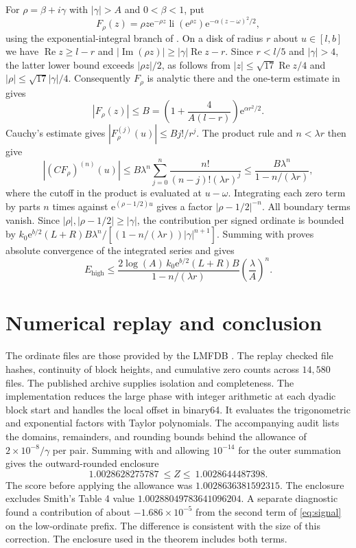 \documentclass[11pt]{article}
\newcommand{\lii}{\operatorname{li}}
\newcommand{\ee}{\mathrm{e}}
\begin{document}
For $\rho=\beta+i\gamma$ with $|\gamma|>A$ and $0<\beta<1$, put
\[
F_\rho(z)=\rho z\ee^{-\rho z}\lii(\ee^{\rho z})
          \ee^{-\alpha(z-\omega)^2/2},
\]
using the exponential-integral branch of \cite[(4.11)]{revers}.
On a disk of radius $r$ about $u\in[l,b]$ we have
$\operatorname{Re}z\ge l-r$ and
$|\operatorname{Im}(\rho z)|\ge|\gamma|\operatorname{Re}z-r$.
Since $r<l/5$ and $|\gamma|>4$, the latter lower bound exceeds
$|\rho z|/2$, as follows from $|z|\le\sqrt{17}\operatorname{Re}z/4$
and $|\rho|\le\sqrt{17}|\gamma|/4$.
Consequently $F_\rho$ is analytic there and the one-term estimate
in \cite[(4.12)]{revers} gives
\[
|F_\rho(z)|\le B=\left(1+\frac{4}{A(l-r)}\right)\ee^{\alpha r^2/2}.
\]
Cauchy's estimate gives $|F_\rho^{(j)}(u)|\le Bj!/r^j$.
The product rule and $n<\lambda r$ then give
\[
\left|(C F_\rho)^{(n)}(u)\right|
\le B\lambda^n\sum_{j=0}^n\frac{n!}{(n-j)!(\lambda r)^j}
\le \frac{B\lambda^n}{1-n/(\lambda r)},
\]
where the cutoff in the product is evaluated at $u-\omega$.
Integrating each zero term by parts $n$ times against
$\ee^{(\rho-1/2)u}$ gives a factor $|\rho-1/2|^{-n}$.
All boundary terms vanish. Since $|\rho|,|\rho-1/2|\ge|\gamma|$,
the contribution per signed ordinate is bounded by
$k_0\ee^{b/2}(L+R)B\lambda^n/[(1-n/(\lambda r))|\gamma|^{n+1}]$.
Summing with \cite[Lemma 4.7(a)]{revers} proves absolute convergence
of the integrated series and gives
\[
E_{\mathrm{high}}\le
\frac{2\log(A)\,k_0\ee^{b/2}(L+R)B}{1-n/(\lambda r)}
\left(\frac{\lambda}{A}\right)^n .
\]

\section{Numerical replay and conclusion}
The ordinate files are those provided by the LMFDB \cite{lmfdb}.
The replay checked file hashes, continuity of block heights, and
cumulative zero counts across $14{,}580$ files. The published
archive supplies isolation and completeness. The implementation
reduces the large phase with integer arithmetic at each dyadic
block start and handles the local offset in binary64. It evaluates
the trigonometric and exponential factors with Taylor polynomials.
The accompanying audit lists the domains, remainders, and rounding
bounds behind the allowance of $2\times10^{-8}/\gamma$ per pair.
Summing with \cite[Lemma 4.8]{revers} and allowing $10^{-14}$ for
the outer summation gives the outward-rounded enclosure
\[
1.0028628275787\ \le Z\le\ 1.0028644487398 .
\]
The score before applying the allowance was $1.0028636381592315$.
The enclosure excludes Smith's Table 4 value $1.00288049783641096204$.
A separate diagnostic found a contribution of about $-1.686\times10^{-5}$
from the second term of \eqref{eq:signal} on the low-ordinate prefix.
The difference is consistent with the size of this correction.
The enclosure used in the theorem includes both terms.
\end{document}
